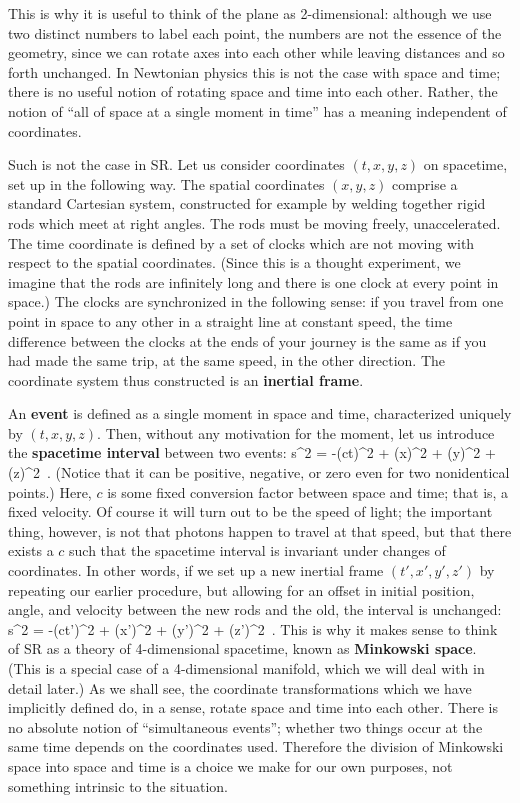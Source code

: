 This is why it is useful to think of the plane as 2-dimensional: although
we use two distinct numbers to label each point, the numbers are not the
essence of the geometry, since we can rotate axes into each other while
leaving distances and so forth unchanged.  In Newtonian physics this is
not the case with space and time; there is no useful notion of rotating
space and time into each other.  Rather, the notion of ``all of space at
a single moment in time'' has a meaning independent of coordinates.

Such is not the case in SR.  Let us consider coordinates $(t,x,y,z)$ on
spacetime, set up in the following way.  The spatial coordinates $(x,y,z)$
comprise a standard Cartesian system, constructed for example by welding
together rigid rods which meet at right angles.  The rods must be moving
freely, unaccelerated.  The time coordinate is
defined by a set of clocks which are not moving with respect to the
spatial coordinates.  (Since this is a thought experiment, we imagine that
the rods are infinitely long and there is one clock at every point in space.)
The clocks are synchronized in the following sense: if you travel from one
point in space to any other in a straight line at constant speed, the time
difference between the clocks at the ends of your journey is the same as
if you had made the same trip, at the same speed, in the other direction.
The coordinate system thus constructed is an {\bf inertial frame}.

An {\bf event} is defined as a single moment in space and time, characterized
uniquely by $(t,x,y,z)$.
Then, without any motivation for the moment, let us introduce the 
{\bf spacetime interval} between two events:
\be
  s^2 = -(c\Delta t)^2 + (\Delta x)^2 + (\Delta y)^2 + (\Delta z)^2\ .
  \label{1.3}
\ee
(Notice that it can be positive, negative, or zero even for two nonidentical
points.) Here, $c$ is some fixed conversion factor between space and time; 
that is, a fixed velocity.  Of course it will turn out to be the speed of 
light; the important thing, however, is not that photons happen to travel at 
that speed, but that there exists a $c$ such that the spacetime interval is
invariant under changes of coordinates.  In other words, if we set up a new
inertial frame $(t',x',y',z')$ by repeating our earlier procedure, but allowing
for an offset in initial position, angle, and velocity between the new rods and
the old, the interval is unchanged:
\be
  s^2 = -(c\Delta t')^2 + (\Delta x')^2 + (\Delta y')^2 + (\Delta z')^2\ .
  \label{1.4}
\ee
This is why it makes sense to think of SR as a theory of 4-dimensional
spacetime, known as {\bf Minkowski space}.  (This is a special case
of a 4-dimensional manifold, which we will deal with in detail later.)
As we shall see, the coordinate transformations which we have
implicitly defined do, in a sense, rotate space and time into each other.
There is no absolute notion of ``simultaneous events''; whether two things
occur at the same time depends on the coordinates used.  Therefore the
division of Minkowski space into space and time is a choice we make for 
our own purposes, not something intrinsic to the situation.

